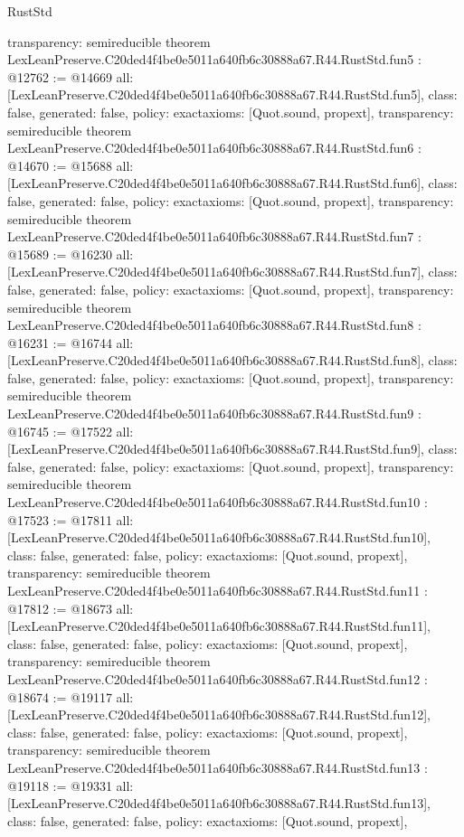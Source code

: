 \begin{lexlean}{RustStd}
\begin{coremodule}
{  transparency: semireducible
}
theorem LexLeanPreserve.C20ded4f4be0e5011a640fb6c30888a67.R44.RustStd.fun5 : @12762 := @14669 {
  all: [LexLeanPreserve.C20ded4f4be0e5011a640fb6c30888a67.R44.RustStd.fun5],
  class: false,
  generated: false,
  policy: exact{axioms: [Quot.sound, propext]},
  transparency: semireducible
}
theorem LexLeanPreserve.C20ded4f4be0e5011a640fb6c30888a67.R44.RustStd.fun6 : @14670 := @15688 {
  all: [LexLeanPreserve.C20ded4f4be0e5011a640fb6c30888a67.R44.RustStd.fun6],
  class: false,
  generated: false,
  policy: exact{axioms: [Quot.sound, propext]},
  transparency: semireducible
}
theorem LexLeanPreserve.C20ded4f4be0e5011a640fb6c30888a67.R44.RustStd.fun7 : @15689 := @16230 {
  all: [LexLeanPreserve.C20ded4f4be0e5011a640fb6c30888a67.R44.RustStd.fun7],
  class: false,
  generated: false,
  policy: exact{axioms: [Quot.sound, propext]},
  transparency: semireducible
}
theorem LexLeanPreserve.C20ded4f4be0e5011a640fb6c30888a67.R44.RustStd.fun8 : @16231 := @16744 {
  all: [LexLeanPreserve.C20ded4f4be0e5011a640fb6c30888a67.R44.RustStd.fun8],
  class: false,
  generated: false,
  policy: exact{axioms: [Quot.sound, propext]},
  transparency: semireducible
}
theorem LexLeanPreserve.C20ded4f4be0e5011a640fb6c30888a67.R44.RustStd.fun9 : @16745 := @17522 {
  all: [LexLeanPreserve.C20ded4f4be0e5011a640fb6c30888a67.R44.RustStd.fun9],
  class: false,
  generated: false,
  policy: exact{axioms: [Quot.sound, propext]},
  transparency: semireducible
}
theorem LexLeanPreserve.C20ded4f4be0e5011a640fb6c30888a67.R44.RustStd.fun10 : @17523 := @17811 {
  all: [LexLeanPreserve.C20ded4f4be0e5011a640fb6c30888a67.R44.RustStd.fun10],
  class: false,
  generated: false,
  policy: exact{axioms: [Quot.sound, propext]},
  transparency: semireducible
}
theorem LexLeanPreserve.C20ded4f4be0e5011a640fb6c30888a67.R44.RustStd.fun11 : @17812 := @18673 {
  all: [LexLeanPreserve.C20ded4f4be0e5011a640fb6c30888a67.R44.RustStd.fun11],
  class: false,
  generated: false,
  policy: exact{axioms: [Quot.sound, propext]},
  transparency: semireducible
}
theorem LexLeanPreserve.C20ded4f4be0e5011a640fb6c30888a67.R44.RustStd.fun12 : @18674 := @19117 {
  all: [LexLeanPreserve.C20ded4f4be0e5011a640fb6c30888a67.R44.RustStd.fun12],
  class: false,
  generated: false,
  policy: exact{axioms: [Quot.sound, propext]},
  transparency: semireducible
}
theorem LexLeanPreserve.C20ded4f4be0e5011a640fb6c30888a67.R44.RustStd.fun13 : @19118 := @19331 {
  all: [LexLeanPreserve.C20ded4f4be0e5011a640fb6c30888a67.R44.RustStd.fun13],
  class: false,
  generated: false,
  policy: exact{axioms: [Quot.sound, propext]},
}
\end{coremodule}
\end{lexlean}
